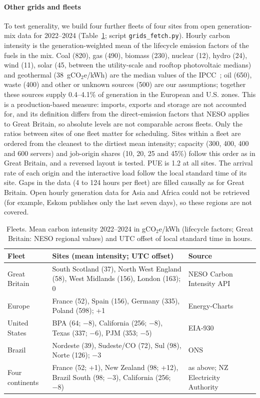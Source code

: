 \paragraph{Other grids and fleets} To test generality, we build four further fleets of four sites from open generation-mix data for 2022--2024 (Table~\ref{tab:fleets}; script \texttt{grids\_fetch.py}). Hourly carbon intensity is the generation-weighted mean of the lifecycle emission factors of the fuels in the mix. Coal (820), gas (490), biomass (230), nuclear (12), hydro (24), wind (11), solar (45, between the utility-scale and rooftop photovoltaic medians) and geothermal (38~gCO$_2$e/kWh) are the median values of the IPCC~\cite{ipcc2014annex3}; oil (650), waste (400) and other or unknown sources (500) are our assumptions; together these sources supply 0.4--4.1\% of generation in the European and U.S. zones. This is a production-based measure: imports, exports and storage are not accounted for, and its definition differs from the direct-emission factors that NESO applies to Great Britain, so absolute levels are not comparable across fleets. Only the ratios between sites of one fleet matter for scheduling. Sites within a fleet are ordered from the cleanest to the dirtiest mean intensity; capacity (300, 400, 400 and 600 servers) and job-origin shares (10, 20, 25 and 45\%) follow this order as in Great Britain, and a reversed layout is tested. PUE is 1.2 at all sites. The arrival rate of each origin and the interactive load follow the local standard time of its site. Gaps in the data (4 to 124 hours per fleet) are filled causally as for Great Britain. Open hourly generation data for Asia and Africa could not be retrieved (for example, Eskom publishes only the last seven days), so these regions are not covered.

\begin{table}[!htbp]
\centering
\caption{Fleets. Mean carbon intensity 2022--2024 in gCO$_2$e/kWh (lifecycle factors; Great Britain: NESO regional values) and UTC offset of local standard time in hours.}
\label{tab:fleets}
\footnotesize
\begin{tabular}{p{2.3cm}p{6.6cm}p{3.2cm}}
\toprule
Fleet & Sites (mean intensity; UTC offset) & Source \\
\midrule
Great Britain & South Scotland (37), North West England (58), West Midlands (156), London (163); 0 & NESO Carbon Intensity API \\
Europe & France (52), Spain (156), Germany (335), Poland (598); +1 & Energy-Charts~\cite{energycharts} \\
United States & BPA (64; $-8$), California (256; $-8$), Texas (337; $-6$), PJM (353; $-5$) & EIA-930~\cite{eia930} \\
Brazil & Nordeste (39), Sudeste/CO (72), Sul (98), Norte (126); $-3$ & ONS~\cite{onsbrazil} \\
Four continents & France (52; +1), New Zealand (98; +12), Brazil South (98; $-3$), California (256; $-8$) & as above; NZ Electricity Authority~\cite{nzea} \\
\bottomrule
\end{tabular}
\end{table}

